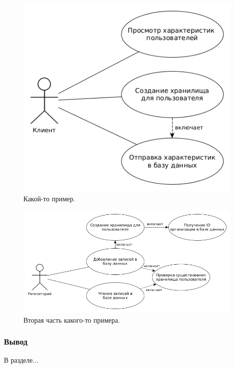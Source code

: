 \begin{figure}[H]
	\centering
	\includegraphics[scale=0.5]{img/useCase.png}
	\caption{Какой-то пример. }
	\label{fig:useCase}
\end{figure}

\begin{figure}[H]
	\centering
	\includegraphics[scale=0.5]{img/useCaseServer.png}
	\caption{Вторая часть какого-то примера. }
	\label{fig:useCaseRepo}
\end{figure}

\subsubsection*{Вывод}
В разделе...

\pagebreak